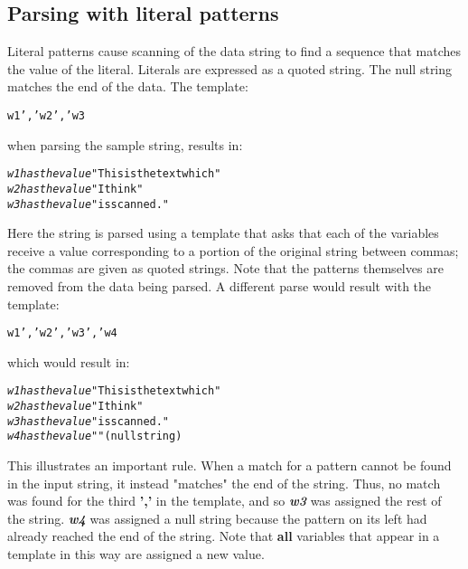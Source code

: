 \subsection{Parsing with literal patterns}
\index{,}
\index{,}
 Literal patterns cause scanning of the data string to find a
sequence that matches the value of the literal.  Literals are expressed
as a quoted string.  The null string matches the end of the data.
 The template:
\begin{alltt}
w1 ',' w2 ',' w3
\end{alltt}
when parsing the sample string, results in:
\begin{alltt}
\emph{w1} \emph{has the value} "This is  the text which"
\emph{w2} \emph{has the value} " I think"
\emph{w3} \emph{has the value} "  is scanned."
\end{alltt}
 Here the string is parsed using a template that asks that each of
the variables receive a value corresponding to a portion of the
original string between commas; the commas are given as quoted strings.
Note that the patterns themselves are removed from the data being
parsed.
 A different parse would result with the template:
\begin{alltt}
w1 ',' w2 ',' w3 ',' w4
\end{alltt}
which would result in:
\begin{alltt}
\emph{w1} \emph{has the value} "This is  the text which"
\emph{w2} \emph{has the value} " I think"
\emph{w3} \emph{has the value} "  is scanned."
\emph{w4} \emph{has the value} ""  (null string)
\end{alltt}
 This illustrates an important rule.  When a match for a pattern
cannot be found in the input string, it instead "matches" the end
of the string.  Thus, no match was found for the third \textbf{','} in
the template, and so \textbf{\emph{w3}} was assigned the rest of
the string. \textbf{\emph{w4}} was assigned a null string
because the pattern on its left had already reached the end of the
string.
 Note that \textbf{all} variables that appear in a template in this
way are assigned a new value.
